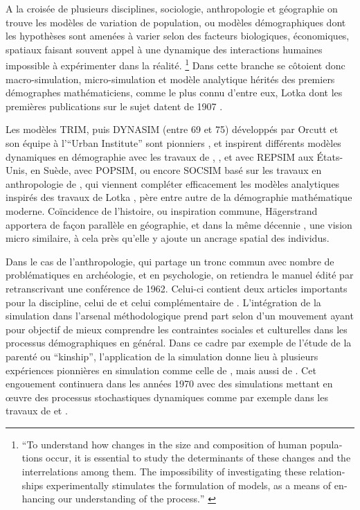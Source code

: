 
A la croisée de plusieurs disciplines, sociologie, anthropologie et géographie on trouve les modèles de variation de population, ou modèles démographiques dont les hypothèses sont amenées à varier selon des facteurs biologiques, économiques, spatiaux faisant souvent appel à une dynamique des interactions humaines impossible à expérimenter dans la réalité. \footnote {\foreignquote{english}{To understand how changes in the size and composition of human populations occur, it is essential to study the determinants of these changes and the interrelations among them. The impossibility of investigating these relationships experimentally stimulates the formulation of models, as a means of enhancing our understanding of the process.} \autocite{Sheps1971}} Dans cette branche se côtoient donc macro-simulation, micro-simulation et modèle analytique hérités des premiers démographes mathématiciens, comme le plus connu d'entre eux, Lotka dont les premières publications sur le sujet datent de 1907 \autocite[355]{Veron2009}.

Les modèles TRIM, puis DYNASIM (entre 69 et 75) développés par Orcutt et son équipe à l'\foreignquote{english}{Urban Institute} sont pionniers \autocite{Orcutt1957, Orcutt1960, Orcutt1976}, et inspirent différents modèles dynamiques en démographie avec les travaux de \textcite{Perrin1964}, \textcite{Sheps1971}, et \textcite{Ridley1966} avec REPSIM aux États-Unis,  \textcite{Hyrenius1964} en Suède, \textcite{Horvitz1971} avec POPSIM, ou encore SOCSIM basé sur les travaux en anthropologie de \textcite{Gilbert1966}, qui viennent compléter efficacement les modèles analytiques inspirés des travaux de Lotka \autocite{Sheps1971}, père entre autre de la démographie mathématique moderne. Coïncidence de l'histoire, ou inspiration commune, Hägerstrand apportera de façon parallèle en géographie, et dans la même décennie \autocite{Hagerstrand1952, Hagerstrand1967}, une vision micro similaire, à cela près qu'elle y ajoute un ancrage spatial des individus.

Dans le cas de l'anthropologie, qui partage un tronc commun avec nombre de problématiques en archéologie, et en psychologie, on retiendra le manuel édité par \textcite{Hymes1965} retranscrivant une conférence de 1962. Celui-ci contient deux articles importants pour la discipline, celui de \textcite{Gullahorn1965} et celui complémentaire de \textcite{Hays1965}. L'intégration de la simulation dans l'arsenal méthodologique prend part selon \textcite[274]{Bentley2009} d'un mouvement ayant pour objectif de mieux comprendre les contraintes sociales et culturelles dans les processus démographiques en général. Dans ce cadre par exemple de l'étude de la parenté ou \foreignquote{english}{kinship}, l'application de la simulation donne lieu à plusieurs expériences pionnières \autocite{Dyke1981} en simulation comme celle de \textcite{Kunstadter1963}, mais aussi de \textcite{Gilbert1966}. Cet engouement continuera dans les années 1970 \autocite{Read1999} avec des simulations mettant en œuvre des processus stochastiques dynamiques comme par exemple dans les travaux de \textcite{Howell1978} et \textcite{Thomas1973}.

